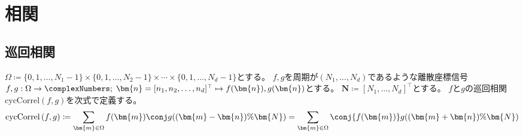 \part{相関}
    \chapter{巡回相関}
        \newcommand*{\cycCorrel}[2]{\mathrm{cycCorrel}\left(#1,#2\right)}
        $\Omega \coloneq \{0,1,\dots,N_1-1\}\times\{0,1,\dots,N_2-1\}\times\cdots\times\{0,1,\dots,N_d-1\}$とする。
        $f,g$を周期が$(N_1,\dots,N_d)$であるような離散座標信号$f,g: \Omega\to\complexNumbers;\;\bm{n} = [n_1,n_2,\dots,n_d]^\top \mapsto f(\bm{n}),g(\bm{n})$とする。
        $\bm{N} \coloneq [N_1,\dots,N_d]^\top$とする。
        $f$と$g$の巡回相関$\cycCorrel{f}{g}$を次式で定義する。
        \[ \cycCorrel{f}{g} \coloneq \sum_{\bm{m}\in\Omega} f(\bm{m})\conj{g((\bm{m}-\bm{n})\%\bm{N})} = \sum_{\bm{m}\in\Omega} \conj{f(\bm{m})}g((\bm{m}+\bm{n})\%\bm{N}) \]